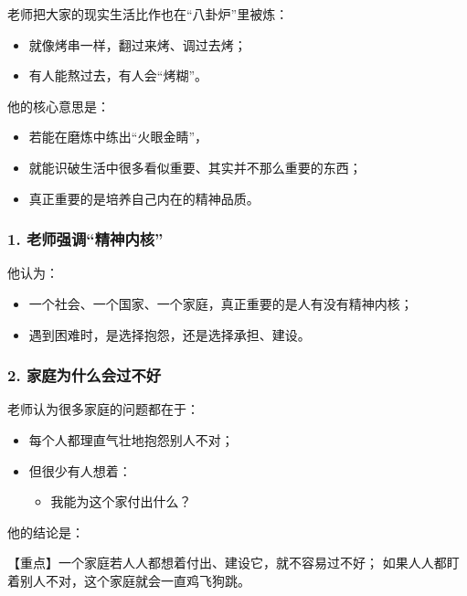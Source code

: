 \documentclass[
  chinese,
  9pt,
  a4paper,
]{ctexart}
\providecommand{\tightlist}{%
  \setlength{\itemsep}{0pt}\setlength{\parskip}{0pt}}
\begin{document}
老师把大家的现实生活比作也在``八卦炉''里被炼：

\begin{itemize}
\tightlist
\item
  就像烤串一样，翻过来烤、调过去烤；
\item
  有人能熬过去，有人会``烤糊''。
\end{itemize}

他的核心意思是：

\begin{itemize}
\tightlist
\item
  若能在磨炼中练出``火眼金睛''，
\item
  就能识破生活中很多看似重要、其实并不那么重要的东西；
\item
  真正重要的是培养自己内在的精神品质。
\end{itemize}

\subsubsection{1.
老师强调``精神内核''}\label{ux8001ux5e08ux5f3aux8c03ux7cbeux795eux5185ux6838}

他认为：

\begin{itemize}
\tightlist
\item
  一个社会、一个国家、一个家庭，真正重要的是人有没有精神内核；
\item
  遇到困难时，是选择抱怨，还是选择承担、建设。
\end{itemize}

\subsubsection{2.
家庭为什么会过不好}\label{ux5bb6ux5eadux4e3aux4ec0ux4e48ux4f1aux8fc7ux4e0dux597d}

老师认为很多家庭的问题都在于：

\begin{itemize}
\item
  每个人都理直气壮地抱怨别人不对；
\item
  但很少有人想着：

  \begin{itemize}
  \tightlist
  \item
    我能为这个家付出什么？
  \end{itemize}
\end{itemize}

他的结论是：

【重点】一个家庭若人人都想着付出、建设它，就不容易过不好；
如果人人都盯着别人不对，这个家庭就会一直鸡飞狗跳。
\end{document}
